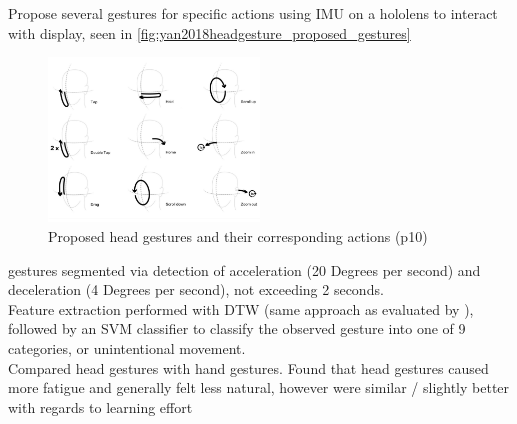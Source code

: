 \cite{yan2018headgesture} Propose several gestures for specific actions using IMU on a hololens to interact with display, seen in \autoref{fig:yan2018headgesture_proposed_gestures}\\
\begin{figure}
    \centering
    \includegraphics[width=0.5\textwidth]{figures/yan2018headgesture_fig2_proposed_gestures.png}
    \caption{\label{fig:yan2018headgesture_proposed_gestures} Proposed head gestures and their corresponding actions (p10)\cite{yan2018headgesture}}
\end{figure}
gestures segmented via detection of acceleration (20 Degrees per second) and deceleration (4 Degrees per second), not exceeding 2 seconds.\\
Feature extraction performed with DTW (same approach as evaluated by \cite{hachaj2019evaluation}), followed by an SVM classifier to classify the observed gesture into one of 9 categories, or unintentional movement.\\
Compared head gestures with hand gestures. Found that head gestures caused more fatigue and generally felt less natural, however were similar / slightly better with regards to learning effort

